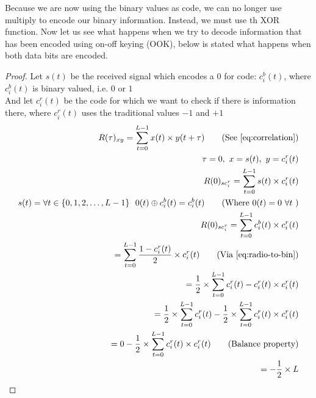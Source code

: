 		Because we are now using the binary values as code, we can no longer use multiply to encode our binary information.
		Instead, we must use th XOR function.
		Now let us see what happens when we try to decode information that has been encoded using on-off keying (OOK), below is stated what happens when both data bits are encoded.

		\begin{proof}
			Let $s(t)$ be the received signal which encodes a 0 for code: $c^b_i(t)$, where $c^b_i(t)$ is binary valued, i.e. $0$ or $1$ \\
			And let $c^r_i(t)$ be the code for which we want to check if there is information there, where $c^r_i(t)$ uses the traditional values $-1$ and $+1$ \\

			\begin{align*}
				R(\tau)_{xy} = \displaystyle\sum_{t = 0} ^ {L - 1} x(t) \times y(t + \tau)	\tag{See \autoref{eq:correlation}}
				\\ \tau = 0,\ x = s(t),\ y = c^r_i(t)	
				\\ R(0)_{sc^r_{i}} = \displaystyle\sum_{t = 0} ^ {L - 1} s(t) \times c^r_i(t)	
				\\ s(t) = \forall t \in \{ 0, 1, 2, \dotsc, L - 1 \} \ \ 0(t) \oplus c^b_i(t) = c^b_i(t) \tag{Where $0(t) = 0 \ \forall t$ }										
				\\ R(0)_{sc^r_{i}} = \displaystyle\sum_{t = 0} ^ {L - 1} c^b_i(t) \times c^r_i(t)
				\\ = \displaystyle\sum_{t = 0} ^ {L - 1} \frac{1 - c^r_i(t)}{2} \times c^r_i(t) \tag{Via \autoref{eq:radio-to-bin}}
				\\ = \frac{1}{2} \times \displaystyle\sum_{t = 0} ^ {L - 1} c^r_i(t) - c^r_i(t) \times c^r_i(t)
				\\ = \frac{1}{2} \times \displaystyle\sum_{t = 0} ^ {L - 1} c^r_i(t) - \frac{1}{2} \times \displaystyle\sum_{t = 0} ^ {L - 1} c^r_i(t) \times c^r_i(t)
				\\ = 0 - \frac{1}{2} \times \displaystyle\sum_{t = 0} ^ {L - 1} c^r_i(t) \times c^r_i(t) \tag{Balance property}
				\\ = - \frac{1}{2} \times L
			\end{align*}

		\end{proof}

